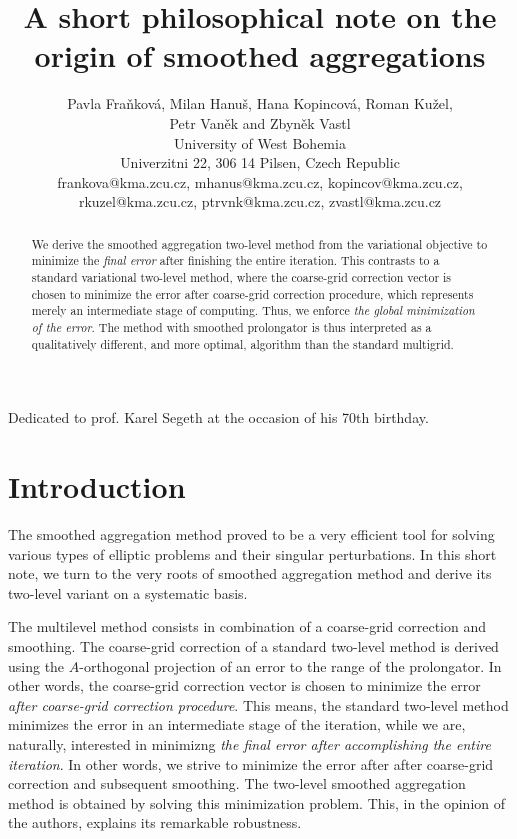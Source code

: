 \documentclass[twoside, 12pt]{article}
\title{A short philosophical note on the origin of smoothed aggregations}
\author{Pavla Fra\v{n}kov\'{a}, Milan Hanu\v{s},
Hana Kopincov\'{a}, Roman Ku\v{z}el,\\
Petr Van\v{e}k and Zbyn\v{e}k Vastl\\
\vskip 2mm {\small
University of West Bohemia\\
Univerzitni 22, 306 14 Pilsen, Czech Republic\\
frankova@kma.zcu.cz, mhanus@kma.zcu.cz, kopincov@kma.zcu.cz, rkuzel@kma.zcu.cz, ptrvnk@kma.zcu.cz, zvastl@kma.zcu.cz
	}
}
\begin{document}

\smallskip
\begin{center}
Dedicated to prof. Karel Segeth at the occasion of his 70th birthday.
\end{center}
\smallskip

\begin{abstract}
We derive the smoothed aggregation two-level method from the variational
objective to minimize the {\em final error} after finishing the entire
iteration.
This contrasts to a standard variational two-level method,
where the coarse-grid correction vector is chosen to minimize the error
after coarse-grid correction procedure, which represents merely
an intermediate
stage of computing. Thus, we enforce
{\em the global minimization of the error}.
The method with smoothed prolongator
is thus interpreted as a qualitatively different, and more optimal, algorithm
than the standard multigrid.
\end{abstract}

\section{Introduction}
The smoothed aggregation method
\cite{vanek-accel,FMS,amg-theory,Vanek_Mandel_Brezina_1995} proved
to be a very efficient tool for solving various types
of elliptic problems and their singular perturbations.
In this short note, we turn
to the very roots of smoothed aggregation method and derive its
two-level variant on a systematic basis.

The multilevel method consists in combination of a coarse-grid correction
and smoothing.
The coarse-grid correction of a standard
two-level method is derived using the $A$-orthogonal projection of an
error to the range of the prolongator.
In other words, the coarse-grid correction
vector
is chosen to minimize the error {\em after coarse-grid correction procedure}.
This means, the standard two-level method
minimizes the error in an intermediate stage of the iteration, while
we are, naturally, interested in
minimizng  {\em the final error after accomplishing the entire iteration}.
In other words, we strive to minimize the error after
after coarse-grid correction and
subsequent smoothing. The two-level smoothed aggregation method
is obtained by solving this minimization problem. This, in the opinion
of the authors, explains its remarkable robustness.
\end{document}
